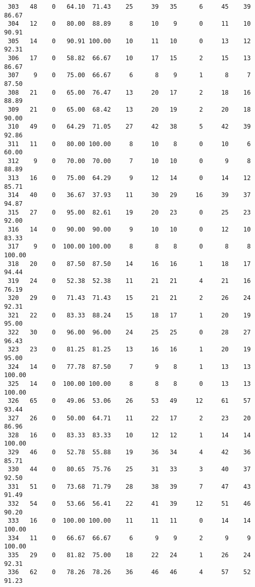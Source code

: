 \begin{verbatim}
 303   48    0   64.10  71.43    25     39   35      6     45    39    86.67
 304   12    0   80.00  88.89     8     10    9      0     11    10    90.91
 305   14    0   90.91 100.00    10     11   10      0     13    12    92.31
 306   17    0   58.82  66.67    10     17   15      2     15    13    86.67
 307    9    0   75.00  66.67     6      8    9      1      8     7    87.50
 308   21    0   65.00  76.47    13     20   17      2     18    16    88.89
 309   21    0   65.00  68.42    13     20   19      2     20    18    90.00
 310   49    0   64.29  71.05    27     42   38      5     42    39    92.86
 311   11    0   80.00 100.00     8     10    8      0     10     6    60.00
 312    9    0   70.00  70.00     7     10   10      0      9     8    88.89
 313   16    0   75.00  64.29     9     12   14      0     14    12    85.71
 314   40    0   36.67  37.93    11     30   29     16     39    37    94.87
 315   27    0   95.00  82.61    19     20   23      0     25    23    92.00
 316   14    0   90.00  90.00     9     10   10      0     12    10    83.33
 317    9    0  100.00 100.00     8      8    8      0      8     8   100.00
 318   20    0   87.50  87.50    14     16   16      1     18    17    94.44
 319   24    0   52.38  52.38    11     21   21      4     21    16    76.19
 320   29    0   71.43  71.43    15     21   21      2     26    24    92.31
 321   22    0   83.33  88.24    15     18   17      1     20    19    95.00
 322   30    0   96.00  96.00    24     25   25      0     28    27    96.43
 323   23    0   81.25  81.25    13     16   16      1     20    19    95.00
 324   14    0   77.78  87.50     7      9    8      1     13    13   100.00
 325   14    0  100.00 100.00     8      8    8      0     13    13   100.00
 326   65    0   49.06  53.06    26     53   49     12     61    57    93.44
 327   26    0   50.00  64.71    11     22   17      2     23    20    86.96
 328   16    0   83.33  83.33    10     12   12      1     14    14   100.00
 329   46    0   52.78  55.88    19     36   34      4     42    36    85.71
 330   44    0   80.65  75.76    25     31   33      3     40    37    92.50
 331   51    0   73.68  71.79    28     38   39      7     47    43    91.49
 332   54    0   53.66  56.41    22     41   39     12     51    46    90.20
 333   16    0  100.00 100.00    11     11   11      0     14    14   100.00
 334   11    0   66.67  66.67     6      9    9      2      9     9   100.00
 335   29    0   81.82  75.00    18     22   24      1     26    24    92.31
 336   62    0   78.26  78.26    36     46   46      4     57    52    91.23

\end{verbatim}
